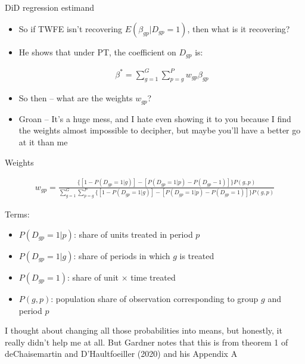 \documentclass{beamer}
\begin{document}
\begin{frame}{DiD regression estimand}

\begin{itemize}
\item So if TWFE isn't recovering $E(\beta_{gp} | D_{gp} = 1)$, then what is it recovering?
\item He shows that under PT, the coefficient on $D_{gp}$ is:

\begin{eqnarray*}
\beta^* = \sum_{g=1}^G \sum_{p=g}^P w_{gp}\beta_{gp}
\end{eqnarray*}

\item So then -- what are the weights $w_{gp}$?
\item Groan -- It's a huge mess, and I hate even showing it to you because I find the weights almost impossible to decipher, but maybe you'll have a better go at it than me
\end{itemize}

\end{frame}

\begin{frame}{Weights}

\footnotesize
\begin{eqnarray*}
w_{gp} = \frac{ \bigg \{ [ 1-P(D_{gp}=1|g) ] - [P(D_{gp}=1|p) -  P(D_{gp}-1) ] \bigg \} P(g,p)}{
\sum_{g=1}^G \sum_{p=g}^P \bigg \{ [ 1-P(D_{gp}=1 | g) ] - [P(D_{gp}=1 | p) - P(D_{gp}=1) ] \bigg \}P(g,p)}
\end{eqnarray*}

Terms: 
\begin{itemize}
\item $P(D_{gp}=1|p)$: share of units treated in period $p$
\item $P(D_{gp}=1|g)$: share of periods in which $g$ is treated
\item $P(D_{gp}=1)$: share of unit $\times$ time treated
\item $P(g,p)$: population share of observation corresponding to group $g$ and period $p$
\end{itemize}

I thought about changing all those probabilities into means, but honestly, it really didn't help me at all.  But Gardner notes that this is from theorem 1 of deChaisemartin and D'Haultfoeiller (2020) and his Appendix A

\end{frame}
\end{document}
